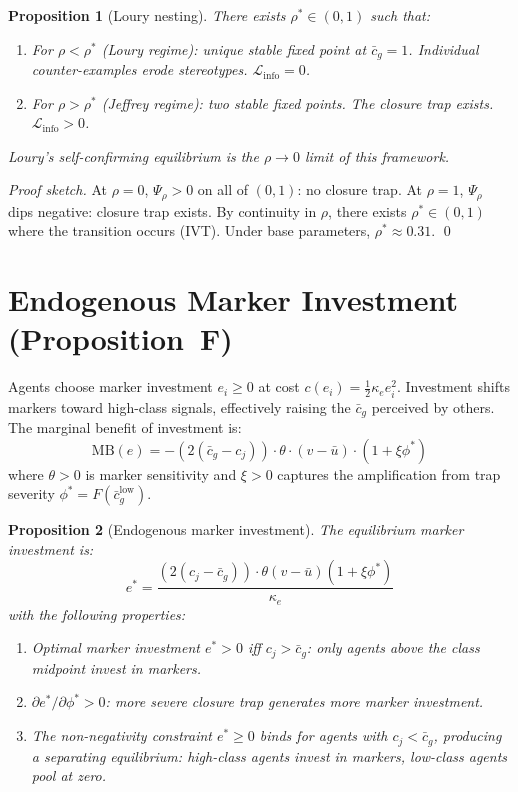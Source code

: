 \documentclass[12pt,a4paper]{article}
\newtheorem{proposition}{Proposition}
\theoremstyle{definition}
\numberwithin{proposition}{subsection}
\begin{document}
\begin{proposition}[Loury nesting]
\label{prop:loury-nesting}
There exists $\rho^* \in (0,1)$ such that:
\begin{enumerate}[noitemsep]
  \item For $\rho < \rho^*$ (Loury regime): unique stable fixed
  point at $\bar{c}_g = 1$. Individual counter-examples erode
  stereotypes. $\mathcal{L}_{\mathrm{info}} = 0$.
  \item For $\rho > \rho^*$ (Jeffrey regime): two stable fixed
  points. The closure trap exists. $\mathcal{L}_{\mathrm{info}} > 0$.
\end{enumerate}
Loury's self-confirming equilibrium is the $\rho \to 0$ limit of
this framework.
\end{proposition}

\begin{proof}[Proof sketch]
At $\rho = 0$, $\Psi_\rho > 0$ on all of $(0,1)$: no closure trap.
At $\rho = 1$, $\Psi_\rho$ dips negative: closure trap exists. By
continuity in $\rho$, there exists $\rho^* \in (0,1)$ where the
transition occurs (IVT). Under base parameters, $\rho^* \approx 0.31$.
\qed
\end{proof}

\section{Endogenous Marker Investment (Proposition~F)}
\label{app:veblen}

Agents choose marker investment $e_i \geq 0$ at cost
$c(e_i) = \frac{1}{2}\kappa_e e_i^2$. Investment shifts markers
toward high-class signals, effectively raising the $\bar{c}_g$ perceived
by others. The marginal benefit of investment is:
\begin{equation}
  \mathrm{MB}(e) = -(2(\bar{c}_g - c_j)) \cdot \theta \cdot
  (v - \bar{u}) \cdot (1 + \xi \phi^*)
  \label{eq:MB}
\end{equation}
where $\theta > 0$ is marker sensitivity and $\xi > 0$ captures the
amplification from trap severity $\phi^* = F(\bar{c}_g^{\mathrm{low}})$.

\begin{proposition}[Endogenous marker investment]
\label{prop:veblen}
The equilibrium marker investment is:
\begin{equation}
  e^* = \frac{(2(c_j - \bar{c}_g)) \cdot \theta(v-\bar{u})(1+\xi\phi^*)}
  {\kappa_e}
  \label{eq:estar}
\end{equation}
with the following properties:
\begin{enumerate}[noitemsep]
  \item Optimal marker investment $e^* > 0$ iff $c_j > \bar{c}_g$: only agents above
  the class midpoint invest in markers.
  \item $\partial e^*/\partial \phi^* > 0$: more severe closure trap
  generates more marker investment.
  \item The non-negativity constraint $e^* \geq 0$ binds for agents
  with $c_j < \bar{c}_g$, producing a separating equilibrium:
  high-class agents invest in markers, low-class agents pool at
  zero.
\end{enumerate}
\end{proposition}
\end{document}
